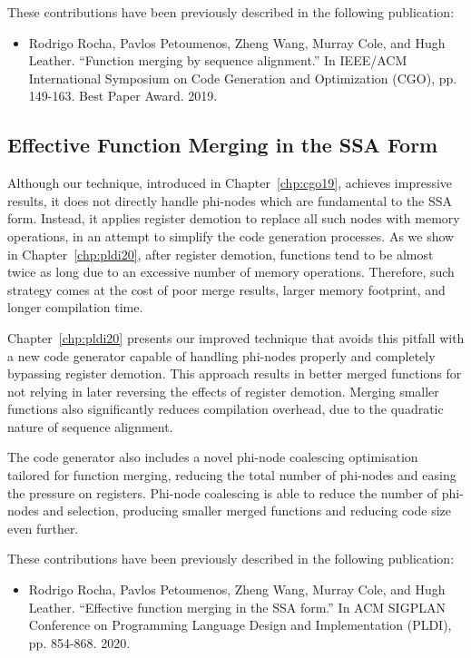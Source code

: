 These contributions have been previously described in the following publication:
\begin{itemize}
\item Rodrigo Rocha, Pavlos Petoumenos, Zheng Wang, Murray Cole, and Hugh Leather. ``Function merging by sequence alignment.'' In IEEE/ACM International Symposium on Code Generation and Optimization (CGO), pp. 149-163. Best Paper Award. 2019.
\end{itemize}


\subsection{Effective Function Merging in the SSA Form}


Although our technique, introduced in Chapter~\ref{chp:cgo19}, achieves impressive results, it does not directly handle phi-nodes which are fundamental to the SSA form.
Instead, it applies register demotion to replace all such nodes with memory operations, in an attempt to simplify the code generation processes.
As we show in Chapter~\ref{chp:pldi20}, after register demotion, functions tend to be almost twice as long due to an excessive number of memory operations.
Therefore, such strategy comes at the cost of poor merge results, larger memory footprint, and longer compilation time.

Chapter~\ref{chp:pldi20} presents our improved technique that avoids this pitfall with a new code generator capable of handling phi-nodes properly and completely bypassing register demotion.
This approach results in better merged functions for not relying in later reversing the effects of register demotion.
Merging smaller functions also significantly reduces compilation overhead, due to the quadratic nature of sequence alignment.

The code generator also includes a novel phi-node coalescing optimisation tailored for function merging, reducing the total number of phi-nodes and easing the pressure on registers.
Phi-node coalescing is able to reduce the number of phi-nodes and selection, producing smaller merged functions and reducing code size even further.

These contributions have been previously described in the following publication:
\begin{itemize}
\item Rodrigo Rocha, Pavlos Petoumenos, Zheng Wang, Murray Cole, and Hugh Leather. ``Effective function merging in the SSA form.'' In ACM SIGPLAN Conference on Programming Language Design and Implementation (PLDI), pp. 854-868. 2020.
\end{itemize}

